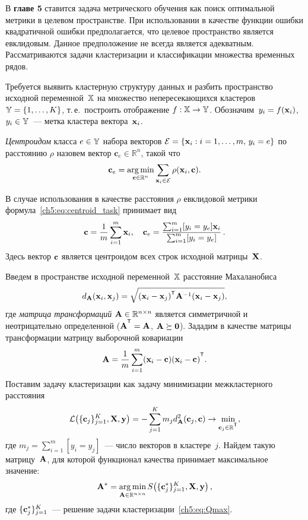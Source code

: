 \documentclass[11pt, a5paper]{dissert}
\begin{document}
В \textbf{главе 5} ставится задача метрического обучения как поиск оптимальной метрики в целевом пространстве.
При использовании в качестве функции ошибки квадратичной ошибки предполагается, что целевое пространство является евклидовым. 
Данное предположение не всегда является адекватным.
Рассматриваются задачи кластеризации и классификации множества временных рядов.

Требуется выявить кластерную структуру данных и разбить пространство исходной переменной~$\mathbb{X}$ на множество непересекающихся кластеров $\mathbb{Y} = \{1, \dots, K\}$, т.\,е.\ построить отображение $f: \mathbb{X} \to \mathbb{Y}$.
Обозначим~$y_i = f (\mathbf{x}_i)$, $y_i \in \mathbb{Y}$~--- метка кластера вектора~$\mathbf{x}_i$.
\begin{definition}
	\label{ch5:def:centroid}
	\textit{Центроидом} класса $e \in \mathbb{Y}$ набора векторов $\mathcal{E} = \{\mathbf{x}_i: i=1, \dots, m, \, y_i=e\}$ по расстоянию $\rho$ назовем вектор $\mathbf{c}_e \in \mathbb{R}^n$, такой что
	\begin{equation}
		\label{ch5:eq:centroid_task}
		\mathbf{c}_e = \mathop{\arg \min}\limits_{{\mathbf{c} \in \mathbb{R}^n}}\sum_{\mathbf{x}_i \in \mathcal{E}}
		\rho(\mathbf{x}_i ,\mathbf{c}).
	\end{equation}
\end{definition}
В случае использования в качестве расстояния $\rho$ евклидовой метрики формула~\eqref{ch5:eq:centroid_task} принимает вид
\begin{equation}
	\label{ch5:eq:mu}
	\mathbf{c} =\frac{1}{m} \sum_{i=1}^m\mathbf{x}_i, \quad
	\mathbf{c}_e =\frac{ \sum_{i=1}^m [y_i = y_e]\mathbf{x}_i } {\sum_{i=1}^m [y_i = y_e]}\,.
\end{equation}
Здесь вектор $\mathbf{c}$ является центроидом всех строк исходной матрицы~$\mathbf{X}$.

Введем в пространстве исходной переменной~$\mathbb{X}$ расстояние Махаланобиса
\begin{equation}
	d_{\bA} (\bx_i, \bx_j) = \sqrt{(\bx_i - \bx_j)^{\T} \bA^{-1} (\bx_i - \bx_j)},
	\label{ch5:eq:mahal_distance}
\end{equation}
где \textit{матрица трансформаций} $\mathbf{A} \in \mathbb{R}^{n \times n}$ является симметричной и неотрицательно определенной ($\mathbf{A}^{\T} = \mathbf{A}$, $\mathbf{A} \succeq \boldsymbol{0}$).
Зададим в качестве матрицы трансформации матрицу выборочной ковариации
\begin{equation}
	\label{ch5:eq:covMatrix}
	\bA = \frac{1}{m} \sum_{i=1}^m(\bx_i - \bc)(\bx_i - \bc)^{\T}.
\end{equation}
Поставим задачу кластеризации как задачу минимизации межкластерного расстояния
\begin{equation}
	\label{ch5:eq:Qmax}
	\cL \bigl(\{\bc_j\}_{j=1}^K, \bX, \by\bigr)= - \sum_{j=1}^K m_j d_{\bA}^2(\bc_j, \bc) \rightarrow \min_{\bc_j \in \bbR^{\T}},
\end{equation}
где $m_j = \sum_{i=1}^m [y_i = y_j]$~--- число векторов в кластере~$j$.
Найдем такую матрицу~$\mathbf{A}$, для которой функционал качества принимает максимальное значение:
\begin{equation}
	\label{ch5:eq:Amax}
	\mathbf{A}^* =\mathop{\arg \min}\limits_{\mathbf{A} \in \mathbb{R}^{n \times n}} S \bigl(\{\mathbf{c}_j^*\}_{j=1}^K, \mathbf{X}, \mathbf{y} \bigr)\,,
\end{equation}
где $\{\mathbf{c}_j^*\}_{j=1}^K$~--- решение задачи кластеризации~\eqref{ch5:eq:Qmax}.
\end{document}
